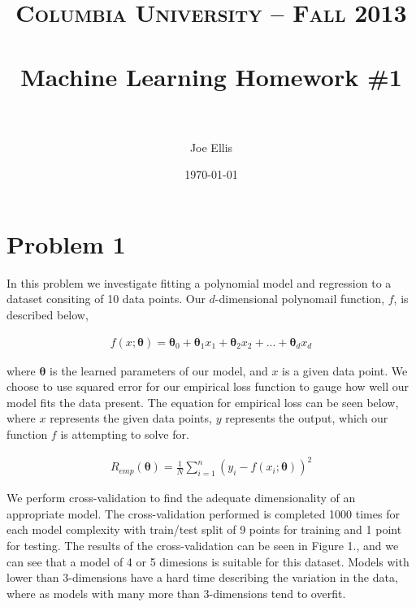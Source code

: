 \documentclass[paper=a4, fontsize=11pt]{scrartcl} %
\title{	
\normalfont \normalsize 
\textsc{Columbia University -- Fall 2013} \\ [25pt] %
\horrule{0.5pt} \\[0.4cm] %
\huge Machine Learning Homework \#1\\ %
\horrule{2pt} \\[0.5cm] %
}
\author{Joe Ellis} %
\date{\normalsize\today} %
\numberwithin{equation}{section} %
\numberwithin{figure}{section} %
\numberwithin{table}{section} %
\begin{document}
\maketitle %


\section{Problem 1}

In this problem we investigate fitting a polynomial model and regression to a dataset consiting of 10 data points.  
Our $d$-dimensional polynomail function, $f$, is described below, 

\begin{align} 
f(x;\bm{\theta}) = \bm{\theta}_{0}	+ \bm{\theta}_{1}x_{1} + \bm{\theta}_{2}x_{2} + ... + \bm{\theta}_{d}x_{d}		
\end{align}

where $\bm{\theta}$ is the learned parameters of our model, and $x$ is a given data point.
We choose to use squared error for our empirical loss function to gauge how well our model fits the data present.  The equation for empirical loss can be seen below, where $x$ represents the given data points, $y$ represents the output, which our function $f$ is attempting to solve for.

\begin{align} 
R_{emp}(\bm{\theta}) = \frac{1}{N}\sum\limits_{i=1}^n (y_{i} - f(x_{i};\bm{\theta}))^{2}
\end{align}

We perform cross-validation to find the adequate dimensionality of an appropriate model.  
The cross-validation performed is completed 1000 times for each model complexity with train/test split of 9 points for training and 1 point for testing.  The results of the cross-validation can be seen in Figure 1., and we can see that a model of 4 or 5 dimesions is suitable for this dataset.  Models with lower than 3-dimensions have a hard time describing the variation in the data, where as models with many more than 3-dimensions tend to overfit.
\end{document}
